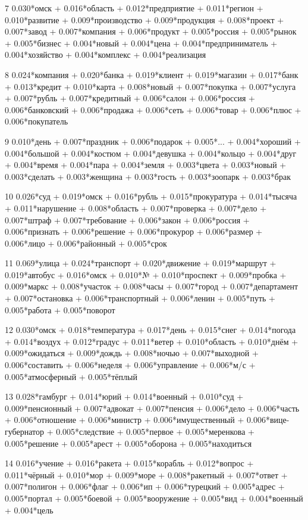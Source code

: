 7 0.030*омск + 0.016*область + 0.012*предприятие + 0.011*регион + 0.010*развитие + 0.009*производство + 0.009*продукция + 0.008*проект + 0.007*завод + 0.007*компания + 0.006*продукт + 0.005*россия + 0.005*рынок + 0.005*бизнес + 0.004*новый + 0.004*цена + 0.004*предприниматель + 0.004*хозяйство + 0.004*комплекс + 0.004*реализация

8 0.024*компания + 0.020*банка + 0.019*клиент + 0.019*магазин + 0.017*банк + 0.013*кредит + 0.010*карта + 0.008*новый + 0.007*покупка + 0.007*услуга + 0.007*рубль + 0.007*кредитный + 0.006*салон + 0.006*россия + 0.006*банковский + 0.006*продажа + 0.006*сеть + 0.006*товар + 0.006*плюс + 0.006*покупатель

9 0.010*день + 0.007*праздник + 0.006*подарок + 0.005*... + 0.004*хороший + 0.004*большой + 0.004*костюм + 0.004*девушка + 0.004*кольцо + 0.004*друг + 0.004*время + 0.004*пара + 0.004*земля + 0.003*цвета + 0.003*новый + 0.003*сделать + 0.003*женщина + 0.003*гость + 0.003*зоопарк + 0.003*брак

10 0.026*суд + 0.019*омск + 0.016*рубль + 0.015*прокуратура + 0.014*тысяча + 0.011*нарушение + 0.008*область + 0.007*проверка + 0.007*дело + 0.007*штраф + 0.007*требование + 0.006*закон + 0.006*россия + 0.006*признать + 0.006*решение + 0.006*прокурор + 0.006*размер + 0.006*лицо + 0.006*районный + 0.005*срок

11 0.069*улица + 0.024*транспорт + 0.020*движение + 0.019*маршрут + 0.019*автобус + 0.016*омск + 0.010*№ + 0.010*проспект + 0.009*пробка + 0.009*маркс + 0.008*участок + 0.008*часы + 0.007*город + 0.007*департамент + 0.007*остановка + 0.006*транспортный + 0.006*ленин + 0.005*путь + 0.005*работа + 0.005*поворот

12 0.030*омск + 0.018*температура + 0.017*день + 0.015*снег + 0.014*погода + 0.014*воздух + 0.012*градус + 0.011*ветер + 0.010*область + 0.010*днём + 0.009*ожидаться + 0.009*дождь + 0.008*ночью + 0.007*выходной + 0.006*составить + 0.006*неделя + 0.006*управление + 0.006*м/с + 0.005*атмосферный + 0.005*тёплый

13 0.028*гамбург + 0.014*юрий + 0.014*военный + 0.010*суд + 0.009*пенсионный + 0.007*адвокат + 0.007*пенсия + 0.006*дело + 0.006*часть + 0.006*отношение + 0.006*министр + 0.006*имущественный + 0.006*вице-губернатор + 0.005*следствие + 0.005*первое + 0.005*меренкова + 0.005*решение + 0.005*арест + 0.005*оборона + 0.005*находиться

14 0.016*учение + 0.016*ракета + 0.015*корабль + 0.012*вопрос + 0.011*чёрный + 0.010*мор + 0.009*море + 0.008*ракетный + 0.007*ответ + 0.007*полигон + 0.006*флаг + 0.006*ип + 0.006*турецкий + 0.005*адрес + 0.005*портал + 0.005*боевой + 0.005*вооружение + 0.005*вид + 0.004*военный + 0.004*цель

